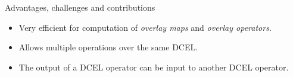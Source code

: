 \documentclass{beamer}
\begin{document}
    \begin{frame}{Advantages, challenges and contributions}
        \begin{itemize}
            \item Very efficient for computation of \textit{overlay maps} and \textit{overlay operators}.
            \item Allows multiple operations over the same DCEL.
            \item The output of a DCEL operator can be input to another DCEL operator.
        \end{itemize}
        \vspace{0.25cm}

        \centering
        
\end{frame}
\end{document}
